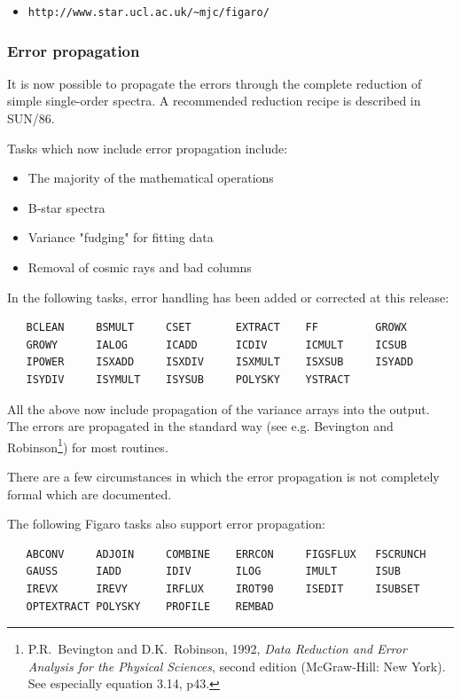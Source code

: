\begin{itemize}
   \item {\tt http://www.star.ucl.ac.uk/\~{}mjc/figaro/}
\end{itemize}

\subsubsection{Error propagation}

 It is now possible to propagate the errors through the complete
 reduction of simple single-order spectra.  A recommended reduction
 recipe is described in SUN/86.

 Tasks which now include error propagation include:

\begin{itemize}
\item The majority of the mathematical operations
\item B-star spectra
\item Variance "fudging" for fitting data
\item Removal of cosmic rays and bad columns
\end{itemize}

 In the following tasks, error handling has been added or corrected
 at this release:

\begin{verbatim}
   BCLEAN     BSMULT     CSET       EXTRACT    FF         GROWX
   GROWY      IALOG      ICADD      ICDIV      ICMULT     ICSUB
   IPOWER     ISXADD     ISXDIV     ISXMULT    ISXSUB     ISYADD
   ISYDIV     ISYMULT    ISYSUB     POLYSKY    YSTRACT
\end{verbatim}

 All the above now include propagation of the variance arrays into
 the output.  The errors are propagated in the standard way (see e.g.
 Bevington and Robinson\footnote{P.R.~Bevington and D.K.~Robinson,
 1992, {\it Data Reduction and Error Analysis for the Physical Sciences},
 second edition (McGraw-Hill: New York).  See especially equation 3.14,
 p43.}) for most routines.

 There are a few circumstances in which the error propagation is not
 completely formal which are documented.

 The following Figaro tasks also support error propagation:

\begin{verbatim}
   ABCONV     ADJOIN     COMBINE    ERRCON     FIGSFLUX   FSCRUNCH
   GAUSS      IADD       IDIV       ILOG       IMULT      ISUB
   IREVX      IREVY      IRFLUX     IROT90     ISEDIT     ISUBSET
   OPTEXTRACT POLYSKY    PROFILE    REMBAD
\end{verbatim}

